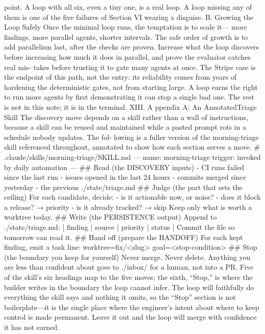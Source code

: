 \documentclass[conference]{IEEEtran}
\begin{document}

point. A loop with all six, even a tiny one, is a real loop. A
loop missing any of them is one of the five failures of Section VI
wearing a disguise.
B. Growing the Loop Safely
Once the minimal loop runs, the temptation is to scale it—
more findings, more parallel agents, shorter intervals. The safe
order of growth is to add parallelism last, after the checks are
proven. Increase what the loop discovers before increasing how
much it does in parallel, and prove the evaluator catches real mis-
takes before trusting it to gate many agents at once. The Stripe
case is the endpoint of this path, not the entry: its reliability
comes from years of hardening the deterministic gates, not from
starting large. A loop earns the right to run more agents by first
demonstrating it can stop a single bad one.
The rest is not in this note; it is in the terminal.
XIII. A ppendix A: An AnnotatedTriage Skill
The discovery move depends on a skill rather than a wall of
instructions, because a skill can be reused and maintained while
a pasted prompt rots in a schedule nobody updates. The fol-
lowing is a fuller version of the morning-triage skill referenced
throughout, annotated to show how each section serves a move.
\# .claude/skills/morning-triage/SKILL.md
---
name: morning-triage
trigger: invoked by daily automation
---
\#\# Read (the DISCOVERY inputs)
- CI runs failed since the last run
- issues opened in the last 24 hours
- commits merged since yesterday
- the previous ./state/triage.md
\#\# Judge (the part that sets the ceiling)
For each candidate, decide:
- is it actionable now, or noise?
- does it block a release? → priority
- is it already tracked? → skip
Keep only what is worth a worktree today.
\#\# Write (the PERSISTENCE output)
Append to ./state/triage.md:
| finding | source | priority | status |
Commit the file so tomorrow can read it.
\#\# Hand off (prepare the HANDOFF)
For each kept finding, emit a task line:
worktree=fix/<slug> goal=<stop-condition>
\#\# Stop (the boundary you keep for yourself)
Never merge. Never delete. Anything you are
less than confident about goes to ./inbox/
for a human, not into a PR.
Five of the skill’s six headings map to the five moves; the sixth,
“Stop,” is where the builder writes in the boundary the loop
cannot infer. The loop will faithfully do everything the skill says
and nothing it omits, so the “Stop” section is not boilerplate—it
is the single place where the engineer’s intent about where to
keep control is made permanent. Leave it out and the loop will
merge with confidence it has not earned.
\end{document}
